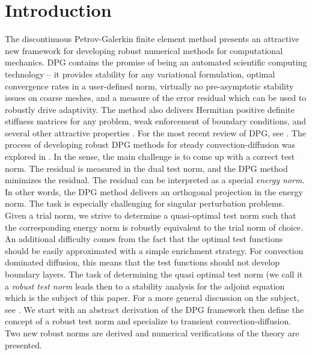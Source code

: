 \documentclass{article}
\theoremstyle{definition}
\theoremstyle{remark}
\begin{document}
\section{Introduction}
The discontinuous Petrov-Galerkin finite element method presents an attractive new framework 
for developing robust numerical methods for computational mechanics.
DPG contains the promise of being an automated scientific computing technology -- it provides stability for any variational formulation, 
optimal convergence rates in a user-defined norm, virtually no pre-asymptotic stability issues on coarse meshes, 
and a measure of the error residual which can be used to robustly drive adaptivity.
The method also delivers Hermitian positive definite stiffness matrices for any problem, 
weak enforcement of boundary conditions, and several other attractive properties \cite{DPG2,DPGOverview,DPGMixed}.
For the most recent review of DPG, see \cite{DPGEncyclopedia}.
The process of developing robust DPG methods for steady convection-diffusion was explored in \cite{DemkowiczHeuer,ChanHeuerThanhDemkowicz2012}.
In the sense, the main challenge is to come up with a correct test norm. The residual is measured
in the dual test norm, and the DPG method minimizes the residual. The residual can be interpreted
as a special {\em energy norm}. In other words, the DPG method delivers an orthogonal
projection in the energy norm. The task is especially challenging for singular perturbation
problems. Given a trial norm, we strive to determine a quasi-optimal test norm such that
the corresponding energy norm is robustly equivalent to the trial  norm of choice. An additional
difficulty comes from the fact that the optimal test functions should be easily approximated
with a simple enrichment strategy. For convection dominated diffusion, this means that
the test functions should not develop boundary layers. The task of determining the
quasi optimal test norm (we call it a {\em robust test norm} leads then to a stability analysis
for the adjoint equation which is the subject of this paper. For a more general discussion
on the subject, see \cite{DPGEncyclopedia}.
We start with an abstract derivation of the DPG framework then define the concept of a robust test norm
and specialize to transient convection-diffusion.
Two new robust norms are derived and numerical verifications of the theory are presented.
\end{document}
